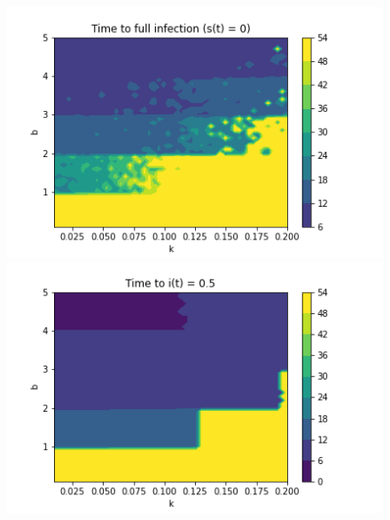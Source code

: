 \documentclass[12pt, reqno]{amsart}
\begin{document}
    \begin{figure}[h]
        \centering
        \begin{minipage}[b]{0.4 \textwidth}
            \includegraphics[width=\textwidth]{phase_transition_full_infection_discrete.png}
            \caption{}
            \label{fig:phase_transition_full_infection_discrete}
        \end{minipage}
        \hfill
        \begin{minipage}[b]{0.4 \textwidth}
            \includegraphics[width=\textwidth]{phase_outnumber_discrete.png}
            \caption{}
            \label{fig:phase_transition_outnumber_discrete}
        \end{minipage}
    \end{figure}

    \newpage 
\end{document}
